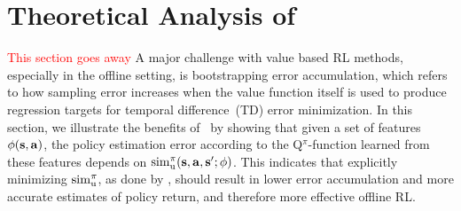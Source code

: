 \iffalse

\section{Theoretical Analysis of \methodname\ }%
\label{sec:analysis}

\textcolor{red}{This section goes away} A major challenge with value based RL methods, especially in the offline setting, is bootstrapping error accumulation, which refers to how sampling error increases when the value function itself is used to produce regression targets for temporal difference~(TD) error minimization.
In this section, we illustrate the benefits of \methodname\ by showing that given a set of features $\phi(\mathbf{s}, \mathbf{a})$, the policy estimation error according to the Q$^\pi$-function learned from these features depends on $\mathrm{sim}_{\mathrm{u}}^\pi(\mathbf{s}, \mathbf{a}, \mathbf{s}'; \phi)$. This indicates that explicitly minimizing $\mathrm{sim}_{\mathrm{u}}^\pi$, as done by \methodname, should result in lower error accumulation and more accurate estimates of policy return, and therefore more effective offline RL.


